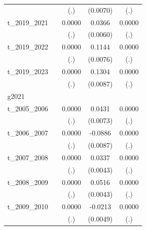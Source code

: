 \begin{table}[htbp]
\begin{tabular}{l*{4}{c}}
            &                     &         (.)         &    (0.0070)         &         (.)         \\
[1em]
t\_2019\_2021 &                     &      0.0000         &      0.0366\sym{***}&      0.0000         \\
            &                     &         (.)         &    (0.0060)         &         (.)         \\
[1em]
t\_2019\_2022 &                     &      0.0000         &      0.1144\sym{***}&      0.0000         \\
            &                     &         (.)         &    (0.0076)         &         (.)         \\
[1em]
t\_2019\_2023 &                     &      0.0000         &      0.1304\sym{***}&      0.0000         \\
            &                     &         (.)         &    (0.0087)         &         (.)         \\
\hline
g2021       &                     &                     &                     &                     \\
t\_2005\_2006 &                     &      0.0000         &      0.0431\sym{***}&      0.0000         \\
            &                     &         (.)         &    (0.0073)         &         (.)         \\
[1em]
t\_2006\_2007 &                     &      0.0000         &     -0.0886\sym{***}&      0.0000         \\
            &                     &         (.)         &    (0.0087)         &         (.)         \\
[1em]
t\_2007\_2008 &                     &      0.0000         &      0.0337\sym{***}&      0.0000         \\
            &                     &         (.)         &    (0.0043)         &         (.)         \\
[1em]
t\_2008\_2009 &                     &      0.0000         &      0.0516\sym{***}&      0.0000         \\
            &                     &         (.)         &    (0.0043)         &         (.)         \\
[1em]
t\_2009\_2010 &                     &      0.0000         &     -0.0213\sym{***}&      0.0000         \\
            &                     &         (.)         &    (0.0049)         &         (.)         \\

\end{tabular}
\end{table}
